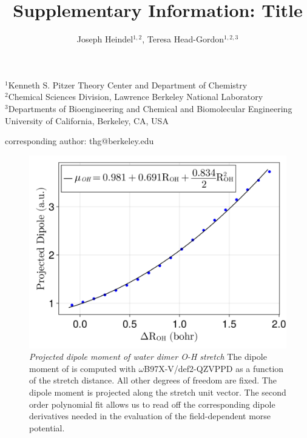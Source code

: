 \documentclass[12pt,letter]{article}
\begin{document}
\title{Supplementary Information: Title}
\author{Joseph Heindel$^{1,2}$, Teresa Head-Gordon$^{1,2,3}$}
\date{\vspace{-10ex}}
\maketitle
\noindent
\begin{center}
$^1$Kenneth S. Pitzer Theory Center and Department of Chemistry\\
$^2$Chemical Sciences Division, Lawrence Berkeley National Laboratory\\
$^3$Departments of Bioengineering and Chemical and Biomolecular Engineering\\
University of California, Berkeley, CA, USA


corresponding author: thg@berkeley.edu
\end{center}

\newpage

 \begin{figure} [H]
    \includegraphics[width=\textwidth]{figures/dipole_derivatives_dimer.png}
    \caption{\textit{Projected dipole moment of water dimer O-H stretch}
    The dipole moment of  is computed with $\omega$B97X-V/def2-QZVPPD as
    a function of the  stretch distance. All other degrees of freedom are fixed.
    The dipole moment is projected along the  stretch unit vector. The second
    order polynomial fit allows us to read off the corresponding dipole derivatives
    needed in the evaluation of the field-dependent morse potential.
}
    \label{fig:dip_derivatives_dimer}
\end{figure}



    
\end{document}
